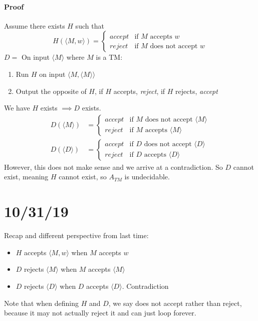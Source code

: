 \documentclass[12 pt]{article}
\begin{document}
\paragraph{Proof} Assume there exists $H$ such that
$$H(\langle M,w \rangle) =
\begin{cases}
  \textit{accept} & \text{if } M \text{ accepts }w\\
  \textit{reject} & \text{if } M \text{ does not accept }w
\end{cases}
$$
$D = $ On input $\langle M \rangle$ where $M$ is a TM:
\begin{enumerate}
\item Run $H$ on input $\langle M,\langle M \rangle \rangle$
\item Output the opposite of $H$, if $H$ accepts, \textit{reject}, if
  $H$ rejects, \textit{accept}
\end{enumerate}
We have $H$ exists $\implies D$ exists.
\begin{align*}
  D(\langle M \rangle) & =
\begin{cases}
  \textit{accept} & \text{if } M \text{ does not accept }\langle M \rangle\\
  \textit{reject} & \text{if } M \text{ accepts }\langle M \rangle
\end{cases}
  \\
  D(\langle D \rangle) & =
\begin{cases}
  \textit{accept} & \text{if } D \text{ does not accept }\langle D \rangle\\
  \textit{reject} & \text{if } D \text{ accepts }\langle D \rangle
\end{cases}
\end{align*}
However, this does not make sense and we arrive at a contradiction. So
$D$ cannot exist, meaning $H$ cannot exist, so $A_{TM}$ is
undecidable.
\section{10/31/19}
Recap and different perspective from last time:
\begin{itemize}
\item $H$ accepts $\langle M,w \rangle$ when $M$ accepts $w$
\item $D$ rejects $\langle M \rangle$ when $M$ accepts $\langle M
  \rangle$
\item $D$ rejects $\langle D \rangle$ when $D$ accepts $\langle D
  \rangle$. Contradiction
\end{itemize}
Note that when defining $H$ and $D$, we say does not accept rather
than reject, because it may not actually reject it and can just loop
forever.
\end{document}
